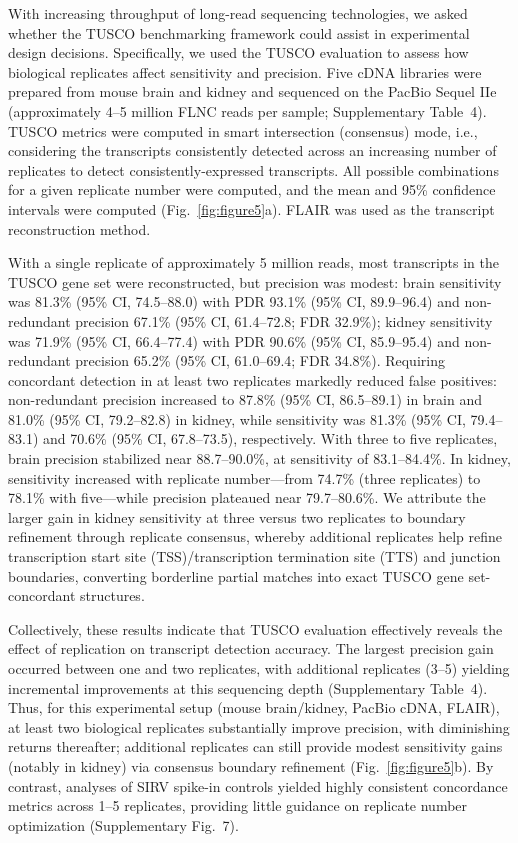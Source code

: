 \documentclass[pdflatex,sn-nature]{sn-jnl}%
\newcommand{\tuscoGeneSet}{TUSCO gene set}
\newcommand{\tuscoBenchmarkingFramework}{TUSCO benchmarking framework}
\newcommand{\tuscoEvaluation}{TUSCO evaluation}
\newcommand{\tuscoMetrics}{TUSCO metrics}
\begin{document}
With increasing throughput of long-read sequencing technologies, we asked whether the \tuscoBenchmarkingFramework{} could assist in experimental design decisions. Specifically, we used the \tuscoEvaluation{} to assess how biological replicates affect sensitivity and precision. Five cDNA libraries were prepared from mouse brain and kidney and sequenced on the PacBio Sequel IIe (approximately 4--5 million FLNC reads per sample; Supplementary Table~4). \tuscoMetrics{} were computed in smart intersection (consensus) mode, i.e., considering the transcripts consistently detected across an increasing number of replicates to detect consistently-expressed transcripts. All possible combinations for a given replicate number were computed, and the mean and 95\% confidence intervals were computed (Fig.~\ref{fig:figure5}a). FLAIR was used as the transcript reconstruction method.

With a single replicate of approximately 5 million reads, most transcripts in the \tuscoGeneSet{} were reconstructed, but precision was modest: brain sensitivity was 81.3\% (95\% CI, 74.5--88.0) with PDR 93.1\% (95\% CI, 89.9--96.4) and non-redundant precision 67.1\% (95\% CI, 61.4--72.8; FDR 32.9\%); kidney sensitivity was 71.9\% (95\% CI, 66.4--77.4) with PDR 90.6\% (95\% CI, 85.9--95.4) and non-redundant precision 65.2\% (95\% CI, 61.0--69.4; FDR 34.8\%). Requiring concordant detection in at least two replicates markedly reduced false positives: non-redundant precision increased to 87.8\% (95\% CI, 86.5--89.1) in brain and 81.0\% (95\% CI, 79.2--82.8) in kidney, while sensitivity was 81.3\% (95\% CI, 79.4--83.1) and 70.6\% (95\% CI, 67.8--73.5), respectively. With three to five replicates, brain precision stabilized near 88.7--90.0\%, at sensitivity of 83.1--84.4\%. In kidney, sensitivity increased with replicate number---from 74.7\% (three replicates) to 78.1\% with five---while precision plateaued near 79.7--80.6\%. We attribute the larger gain in kidney sensitivity at three versus two replicates to boundary refinement through replicate consensus, whereby additional replicates help refine transcription start site (TSS)/transcription termination site (TTS) and junction boundaries, converting borderline partial matches into exact \tuscoGeneSet{}-concordant structures.

Collectively, these results indicate that \tuscoEvaluation{} effectively reveals the effect of replication on transcript detection accuracy. The largest precision gain occurred between one and two replicates, with additional replicates (3--5) yielding incremental improvements at this sequencing depth (Supplementary Table~4). Thus, for this experimental setup (mouse brain/kidney, PacBio cDNA, FLAIR), at least two biological replicates substantially improve precision, with diminishing returns thereafter; additional replicates can still provide modest sensitivity gains (notably in kidney) via consensus boundary refinement (Fig.~\ref{fig:figure5}b). By contrast, analyses of SIRV spike-in controls yielded highly consistent concordance metrics across 1--5 replicates, providing little guidance on replicate number optimization (Supplementary Fig.~7).
\end{document}
